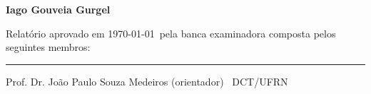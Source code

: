 
%
%
%
%

\begin{titlepage}

\begin{center}

\LARGE

\textbf{\titulo}

\vfill

\Large

\textbf{Iago Gouveia Gurgel}

\end{center}

\vfill

\noindent

Relatório aprovado em \today\ pela banca examinadora composta pelos
seguintes membros:

\begin{center}

\vspace{1.5cm}\rule{0.95\linewidth}{1pt}
\parbox{0.9\linewidth}{%
Prof. Dr. João Paulo Souza Medeiros (orientador) \dotfill\ DCT/UFRN}

\end{center}

\end{titlepage}
